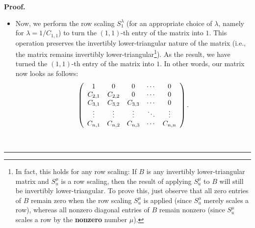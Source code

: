 \documentclass[numbers=enddot,12pt,final,onecolumn,notitlepage]{scrartcl}%
\theoremstyle{definition}
\newenvironment{proof}[1][Proof]{\noindent\textbf{#1.} }{\ \rule{0.5em}{0.5em}}
\begin{document}
\begin{proof}
\begin{itemize}
\item Now, we perform the row scaling $S_{1}^{\lambda}$ (for an appropriate
choice of $\lambda$, namely for $\lambda=1/C_{1,1}$) to turn the $\left(
1,1\right)  $-th entry of the matrix into $1$. This operation preserves the
invertibly lower-triangular nature of the matrix (i.e., the matrix remains
invertibly lower-triangular\footnote{In fact, this holds for any row scaling:
If $B$ is any invertibly lower-triangular matrix and $S_{u}^{\mu}$ is a row
scaling, then the result of applying $S_{u}^{\mu}$ to $B$ will still be
invertibly lower-triangular. To prove this, just observe that all zero entries
of $B$ remain zero when the row scaling $S_{u}^{\mu}$ is applied (since
$S_{u}^{\mu}$ merely scales a row), whereas all nonzero diagonal entries of
$B$ remain nonzero (since $S_{u}^{\mu}$ scales a row by the \textbf{nonzero}
number $\mu$).}). As the result, we have turned the $\left(  1,1\right)  $-th
entry of the matrix into $1$. In other words, our matrix now looks as
follows:
\[
\left(
\begin{array}
[c]{ccccc}%
1 & 0 & 0 & \cdots & 0\\
C_{2,1} & C_{2,2} & 0 & \cdots & 0\\
C_{3,1} & C_{3,2} & C_{3,3} & \cdots & 0\\
\vdots & \vdots & \vdots & \ddots & \vdots\\
C_{n,1} & C_{n,2} & C_{n,3} & \cdots & C_{n,n}%
\end{array}
\right)  .
\]



\end{itemize}
\end{proof}
\end{document}

